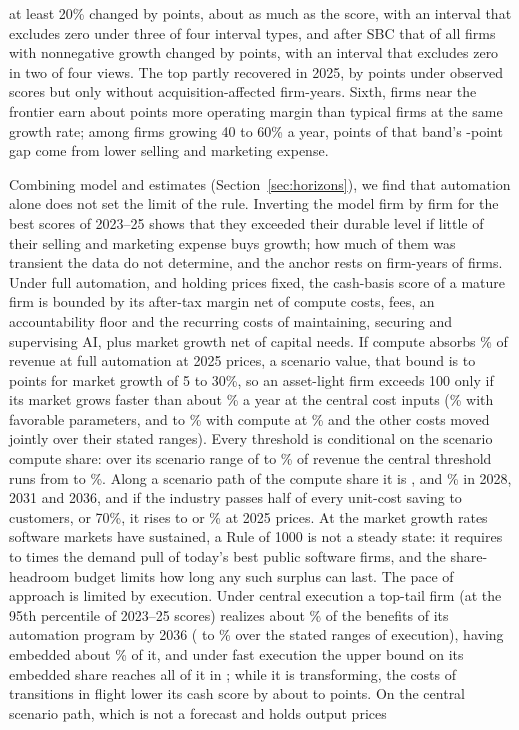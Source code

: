 at least 20\% changed by \TtwentyOp{} points, about as much as the score, with an interval that excludes zero under three of four interval types, and after SBC that of all firms with nonnegative growth changed by \TzeroCash{} points, with an interval that excludes zero in two of four views. The top partly recovered in 2025, by \RecoveryEone{} points under observed scores but only \RecoveryNoAcq{} without acquisition-affected firm-years. Sixth, firms near the frontier earn about \GapV{} points more operating margin than typical firms at the same growth rate; among firms growing 40 to 60\% a year, \GapVFastSM{} points of that band's \GapVFast-point gap come from lower selling and marketing expense.

Combining model and estimates (Section~\ref{sec:horizons}), we find that automation alone does not set the limit of the rule. Inverting the model firm by firm for the best scores of 2023--25 shows that they exceeded their durable level if little of their selling and marketing expense buys growth; how much of them was transient the data do not determine, and the anchor rests on \AncNEone{} firm-years of \AncFirmsEone{} firms. Under full automation, and holding prices fixed, the cash-basis score of a mature firm is bounded by its after-tax margin net of compute costs, fees, an accountability floor and the recurring costs of maintaining, securing and supervising AI, plus market growth net of capital needs. If compute absorbs \CcCen\% of revenue at full automation at 2025 prices, a scenario value, that bound is \CeilCenFive{} to \CeilCenThirty{} points for market growth of 5 to 30\%, so an asset-light firm exceeds 100 only if its market grows faster than about \GstarCenOne\% a year at the central cost inputs (\GstarFav\% with favorable parameters, and \StGstarCcSixMin{} to \StGstarCcSixMax\% with compute at \CcCen\% and the other costs moved jointly over their stated ranges). Every threshold is conditional on the scenario compute share: over its scenario range of \CcLo{} to \CcHi\% of revenue the central threshold runs from \GstarCcLo{} to \GstarCcHi\%. Along a scenario path of the compute share it is \GstarCenTwentyEight, \GstarCenThirtyOne{} and \GstarCenThirtySix\% in 2028, 2031 and 2036, and if the industry passes half of every unit-cost saving to customers, or 70\%, it rises to \GstarPhiHalfOne{} or \GstarPhiSevenOne\% at 2025 prices. At the market growth rates software markets have sustained, a Rule of 1000 is not a steady state: it requires \PullMultLo{} to \PullMultHi{} times the demand pull of today's best public software firms, and the share-headroom budget limits how long any such surplus can last. The pace of approach is limited by execution. Under central execution a top-tail firm (at the 95th percentile of 2023--25 scores) realizes about \PaceCenSix\% of the benefits of its automation program by 2036 (\StRealMin{} to \StRealMax\% over the stated ranges of execution), having embedded about \CenEmbSix\% of it, and under fast execution the upper bound on its embedded share reaches all of it in \PaceFastDone; while it is transforming, the costs of transitions in flight lower its cash score by about \CenDipEight{} to \CenDipSix{} points. On the central scenario path, which is not a forecast and holds output prices 
